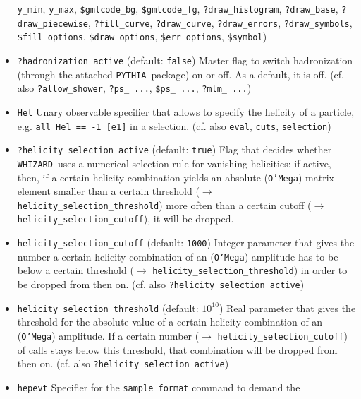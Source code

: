 \documentclass[12pt]{book}
\newcommand{\ttt}[1]{\texttt{#1}}
\newcommand{\whizard}{\texttt{WHIZARD}}
\newcommand{\oMega}{\texttt{O'Mega}}
\newcommand{\pythia}{\texttt{PYTHIA}}
\begin{document}
\begin{itemize}
\ttt{y\_min}, \ttt{y\_max}, \ttt{\$gmlcode\_bg}, \ttt{\$gmlcode\_fg},
\ttt{?draw\_histogram}, \ttt{?draw\_base}, \newline \ttt{?draw\_piecewise},
\ttt{?fill\_curve}, \ttt{?draw\_curve}, \ttt{?draw\_errors},
\ttt{?draw\_symbols}, \newline \ttt{\$fill\_options}, \ttt{\$draw\_options},
\ttt{\$err\_options}, \ttt{\$symbol})
\item
\ttt{?hadronization\_active} \qquad (default: \ttt{false}) \newline
Master flag to switch hadronization (through the attached \pythia\
package) on or off. As a default, it is off. (cf. also
\ttt{?allow\_shower}, \ttt{?ps\_ ...}, \ttt{\$ps\_ ...}, \ttt{?mlm\_
  ...})  
\item
\ttt{Hel} \newline
Unary observable specifier that allows to specify the helicity of a
particle, e.g. \ttt{all Hel == -1 [e1]} in a selection. (cf. also
\ttt{eval}, \ttt{cuts}, \ttt{selection})
\item
\ttt{?helicity\_selection\_active} \qquad (default: \ttt{true})
\newline
Flag that decides whether \whizard\ uses a numerical selection rule
for vanishing helicities: if active, then, if a certain helicity
combination yields an absolute (\oMega) matrix element smaller than a
certain threshold ($\to$ \ttt{helicity\_selection\_threshold}) more
often than a certain cutoff ($\to$ \ttt{helicity\_selection\_cutoff}),
it will be dropped. 
\item
\ttt{helicity\_selection\_cutoff} \qquad (default: \ttt{1000})  \newline
Integer parameter that gives the number a certain helicity combination
of an (\oMega) amplitude has to be below a certain threshold ($\to$
\ttt{helicity\_selection\_threshold}) in order to be dropped from then
on. (cf. also \ttt{?helicity\_selection\_active})
\item
\ttt{helicity\_selection\_threshold} \qquad (default: $10^{10}$)
\newline 
Real parameter that gives the threshold for the absolute value of a
certain helicity combination of an (\oMega) amplitude. If a certain
number ($\to$ \ttt{helicity\_selection\_cutoff}) of calls stays below
this threshold, that combination will be dropped from then
on. (cf. also \ttt{?helicity\_selection\_active})
\item
\ttt{hepevt} \newline 
Specifier for the \ttt{sample\_format} command to demand the

\end{itemize}
\end{document}
